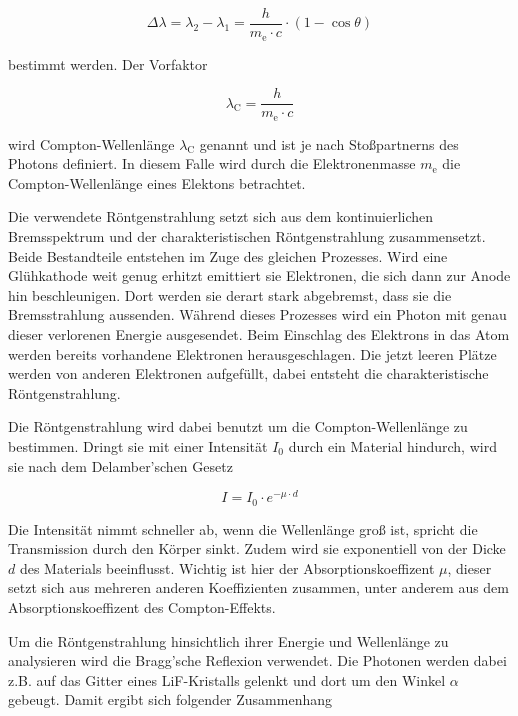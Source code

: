 \begin{equation}
\Delta \lambda = \lambda _2 - \lambda _1 = \frac{h}{m_\text{e} \cdot c} \cdot \left(1 - \cos{\theta}\right)
    \label{eq:deltalambda}
\end{equation}

bestimmt werden.
Der Vorfaktor  

\begin{equation}
    \lambda _\text{C} = \frac{h}{m_\text{e} \cdot c}
    \label{eq:compton}
\end{equation}

wird Compton-Wellenlänge $\lambda _\text{C}$ genannt und ist je nach Stoßpartnerns des Photons definiert.
In diesem Falle wird durch die Elektronenmasse $m_\text{e}$ die Compton-Wellenlänge eines Elektons betrachtet.

Die verwendete Röntgenstrahlung setzt sich aus dem kontinuierlichen Bremsspektrum und der charakteristischen Röntgenstrahlung zusammensetzt.
Beide Bestandteile entstehen im Zuge des gleichen Prozesses.
Wird eine Glühkathode weit genug erhitzt emittiert sie Elektronen, die sich dann zur Anode hin beschleunigen.
Dort werden sie derart stark abgebremst, dass sie die Bremsstrahlung aussenden. 
Während dieses Prozesses wird ein Photon mit genau dieser verlorenen Energie ausgesendet.
Beim Einschlag des Elektrons in das Atom werden bereits vorhandene Elektronen herausgeschlagen.
Die jetzt leeren Plätze werden von anderen Elektronen aufgefüllt, dabei entsteht die charakteristische Röntgenstrahlung.

Die Röntgenstrahlung wird dabei benutzt um die Compton-Wellenlänge zu bestimmen.
Dringt sie mit einer Intensität $I_0$ durch ein Material hindurch, wird sie nach dem Delamber'schen Gesetz 

\begin{equation}
    I = I_0 \cdot e^{- \mu \cdot d}
    \label{eq:delamber}
\end{equation}

Die Intensität nimmt schneller ab, wenn die Wellenlänge groß ist, spricht die Transmission durch den Körper sinkt.
Zudem wird sie exponentiell von der Dicke $d$ des Materials beeinflusst.
Wichtig ist hier der Absorptionskoeffizent $\mu$, dieser setzt sich aus mehreren anderen Koeffizienten zusammen, unter anderem aus dem Absorptionskoeffizent des Compton-Effekts.

Um die Röntgenstrahlung hinsichtlich ihrer Energie und Wellenlänge zu analysieren wird die Bragg'sche Reflexion verwendet.
Die Photonen werden dabei z.B. auf das Gitter eines LiF-Kristalls gelenkt und dort um den Winkel $\alpha$ gebeugt.
Damit ergibt sich folgender Zusammenhang

